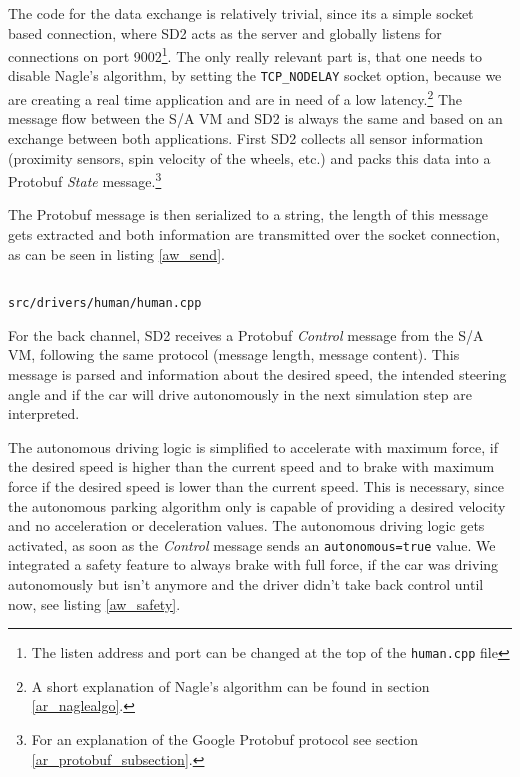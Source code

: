 \documentclass[paper=a4, fontsize=11pt]{scrreprt}
\begin{document}
The code for the data exchange is relatively trivial,
since its a simple socket based connection,
where SD2 acts as the server and globally listens for connections on port 9002\footnote{The listen address and port can be changed at the top of the \texttt{human.cpp} file}.
The only really relevant part is, that one needs to disable Nagle's algorithm,
by setting the \texttt{TCP\_NODELAY} socket option,
because we are creating a real time application and are in need of a low latency.\footnote{A short explanation of Nagle's algorithm can be found in section \ref{ar_naglealgo}.}
The message flow between the S/A VM and SD2 is always the same
and based on an exchange between both applications.
First SD2 collects all sensor information (proximity sensors, spin velocity of the wheels, etc.)
and packs this data into a Protobuf \textit{State} message.\footnote{For an explanation of the Google Protobuf protocol see section \ref{ar_protobuf_subsection}.}

The Protobuf message is then serialized to a string,
the length of this message gets extracted
and both information are transmitted over the socket connection,
as can be seen in listing \ref{aw_send}.

\begin{listing}[ht]
  \inputminted[firstline=352,linenos=true,lastline=363,gobble=4]{c++}{../../../simulators/speed-dreams/src/drivers/human/human.cpp}
  \caption{\texttt{src/drivers/human/human.cpp}}\label{aw_send}
\end{listing}

For the back channel, SD2 receives a Protobuf \textit{Control} message from the S/A VM,
following the same protocol (message length, message content).
This message is parsed and information about the desired speed,
the intended steering angle
and if the car will drive autonomously in the next simulation step are interpreted.

The autonomous driving logic is simplified to accelerate with maximum force,
if the desired speed is higher than the current speed
and to brake with maximum force if the desired speed is lower than the current speed.
This is necessary,
since the autonomous parking algorithm only is capable of providing a desired velocity
and no acceleration or deceleration values.
The autonomous driving logic gets activated,
as soon as the \textit{Control} message sends an \texttt{autonomous=true} value.
We integrated a safety feature to always brake with full force,
if the car was driving autonomously but isn't anymore
and the driver didn't take back control until now, see listing \ref{aw_safety}.
\end{document}
